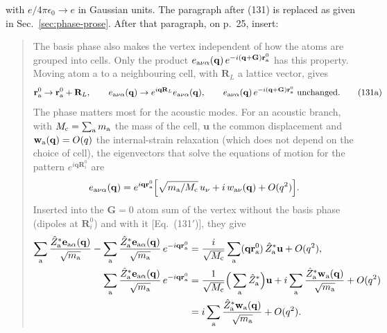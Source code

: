 \documentclass[11pt]{article}
\begin{document}
with $e/4\pi\epsilon_0\to e$ in Gaussian units. The paragraph after (131) is replaced as given in
Sec.~\ref{sec:phase-prose}. After that paragraph, on p.~25, insert:
\begin{quote}
The basis phase also makes the vertex independent of how the atoms are grouped into cells. Only the
product $e_{{\rm a}\nu\alpha}(\mathbf q)\,e^{-i(\mathbf q+\mathbf G)\mathbf r^0_{\rm a}}$ has this property.
Moving atom a to a neighbouring cell, with $\mathbf R_L$ a lattice vector, gives
\begin{equation*}
\mathbf r^0_{\rm a}\to\mathbf r^0_{\rm a}+\mathbf R_L,\qquad
e_{{\rm a}\nu\alpha}(\mathbf q)\to e^{i\mathbf q\mathbf R_L}e_{{\rm a}\nu\alpha}(\mathbf q),\qquad
e_{{\rm a}\nu\alpha}(\mathbf q)\,e^{-i(\mathbf q+\mathbf G)\mathbf r^0_{\rm a}}\ \text{unchanged}.
\tag{131a}
\end{equation*}
The phase matters most for the acoustic modes. For an acoustic branch, with $M_{\rm c}=\sum_{\rm a}m_{\rm a}$
the mass of the cell, $\mathbf u$ the common displacement and $\mathbf w_{\rm a}(\mathbf q)=O(q)$ the
internal-strain relaxation (which does not depend on the choice of cell), the eigenvectors that solve
the equations of motion for the pattern $e^{i\mathbf q\mathbf R^0_i}$ are
\begin{equation*}
e_{{\rm a}\nu\alpha}(\mathbf q)=e^{i\mathbf q\mathbf r^0_{\rm a}}\Big[\sqrt{m_{\rm a}/M_{\rm c}}\,u_\nu
+i\,w_{{\rm a}\nu}(\mathbf q)+O(q^2)\Big].
\end{equation*}
Inserted into the $\mathbf G=0$ atom sum of the vertex without the basis phase (dipoles at
$\mathbf R^0_i$) and with it [Eq.~(131$'$)], they give
\begin{equation*}
\begin{aligned}
\sum_{\rm a}\frac{\hat Z^*_{\rm a}\mathbf e_{{\rm a}\alpha}(\mathbf q)}{\sqrt{m_{\rm a}}}
-\sum_{\rm a}\frac{\hat Z^*_{\rm a}\mathbf e_{{\rm a}\alpha}(\mathbf q)}{\sqrt{m_{\rm a}}}\,e^{-i\mathbf q\mathbf r^0_{\rm a}}
&=\frac{i}{\sqrt{M_{\rm c}}}\sum_{\rm a}(\mathbf q\mathbf r^0_{\rm a})\,\hat Z^*_{\rm a}\mathbf u+O(q^2),\\
\sum_{\rm a}\frac{\hat Z^*_{\rm a}\mathbf e_{{\rm a}\alpha}(\mathbf q)}{\sqrt{m_{\rm a}}}\,e^{-i\mathbf q\mathbf r^0_{\rm a}}
&=\frac{1}{\sqrt{M_{\rm c}}}\Big(\sum_{\rm a}\hat Z^*_{\rm a}\Big)\mathbf u
+i\sum_{\rm a}\frac{\hat Z^*_{\rm a}\mathbf w_{\rm a}(\mathbf q)}{\sqrt{m_{\rm a}}}+O(q^2)\\
&=i\sum_{\rm a}\frac{\hat Z^*_{\rm a}\mathbf w_{\rm a}(\mathbf q)}{\sqrt{m_{\rm a}}}+O(q^2).
\end{aligned}

\end{equation*}
\end{quote}
\end{document}
